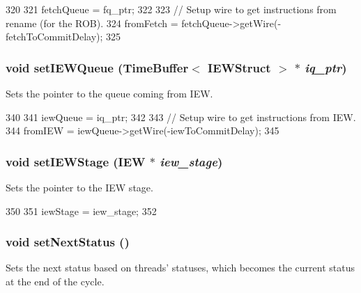 \begin{DoxyCode}
320 {
321     fetchQueue = fq_ptr;
322 
323     // Setup wire to get instructions from rename (for the ROB).
324     fromFetch = fetchQueue->getWire(-fetchToCommitDelay);
325 }
\end{DoxyCode}
\hypertarget{classDefaultCommit_a6b8bf7d75423c9bccd93d50470f7f935}{
\subsubsection[{setIEWQueue}]{\setlength{\rightskip}{0pt plus 5cm}void setIEWQueue ({\bf TimeBuffer}$<$ {\bf IEWStruct} $>$ $\ast$ {\em iq\_\-ptr})}}
\label{classDefaultCommit_a6b8bf7d75423c9bccd93d50470f7f935}
Sets the pointer to the queue coming from IEW. 


\begin{DoxyCode}
340 {
341     iewQueue = iq_ptr;
342 
343     // Setup wire to get instructions from IEW.
344     fromIEW = iewQueue->getWire(-iewToCommitDelay);
345 }
\end{DoxyCode}
\hypertarget{classDefaultCommit_a4b6d8e4b2cf6249763ed2fc73eb1af47}{
\subsubsection[{setIEWStage}]{\setlength{\rightskip}{0pt plus 5cm}void setIEWStage ({\bf IEW} $\ast$ {\em iew\_\-stage})}}
\label{classDefaultCommit_a4b6d8e4b2cf6249763ed2fc73eb1af47}
Sets the pointer to the IEW stage. 


\begin{DoxyCode}
350 {
351     iewStage = iew_stage;
352 }
\end{DoxyCode}
\hypertarget{classDefaultCommit_a4c5106e8a165f2f63807122b80a4e580}{
\subsubsection[{setNextStatus}]{\setlength{\rightskip}{0pt plus 5cm}void setNextStatus ()}}
\label{classDefaultCommit_a4c5106e8a165f2f63807122b80a4e580}
Sets the next status based on threads' statuses, which becomes the current status at the end of the cycle. 


